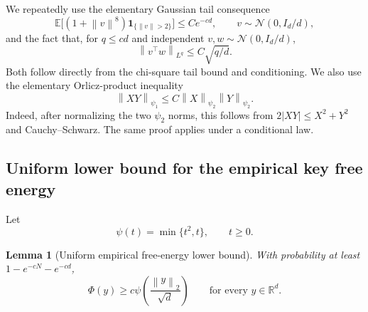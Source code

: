 \documentclass[11pt]{article}
\newtheorem{lemma}[theorem]{Lemma}
\theoremstyle{remark}
\newcommand{\R}{\mathbb R}
\newcommand{\E}{\mathbb E}
\newcommand{\norm}[1]{\left\lVert #1\right\rVert}
\newcommand{\1}{\mathbf 1}
\newcommand{\psiOne}{\psi_1}
\newcommand{\psiTwo}{\psi_2}
\begin{document}
We repeatedly use the elementary Gaussian tail consequence
\begin{equation}
 \E\bigl[(1+\norm v^8)\1_{\{\norm v>2\}}\bigr]\leq Ce^{-cd},
 \qquad v\sim\mathcal N(0,I_d/d),
 \label{eq:gaussian-trunc-tail}
\end{equation}
and the fact that, for $q\leq cd$ and independent
$v,w\sim\mathcal N(0,I_d/d)$,
\begin{equation}
 \norm{v^\top w}_{L^q}\leq C\sqrt{q/d}.
 \label{eq:inner-product-moment}
\end{equation}
Both follow directly from the chi-square tail bound and conditioning.
We also use the elementary Orlicz-product inequality
\begin{equation}
 \norm{XY}_{\psiOne}
 \leq C\norm X_{\psiTwo}\norm Y_{\psiTwo}.
 \label{eq:orlicz-product}
\end{equation}
Indeed, after normalizing the two $\psi_2$ norms, this follows from
$2|XY|\leq X^2+Y^2$ and Cauchy--Schwarz.  The same proof applies under
a conditional law.

\subsection{Uniform lower bound for the empirical key free energy}

Let
\[
 \psi(t)=\min\{t^2,t\},\qquad t\geq0.
\]

\begin{lemma}[Uniform empirical free-energy lower bound]
\label{lem:free-energy}
With probability at least $1-e^{-cN}-e^{-cd}$,
\begin{equation}
 \Phi(y)\geq c\psi\!\left(\frac{\norm y_2}{\sqrt d}\right)
 \qquad\text{for every }y\in\R^d.
 \label{eq:free-energy-lower}
\end{equation}
\end{lemma}
\end{document}
